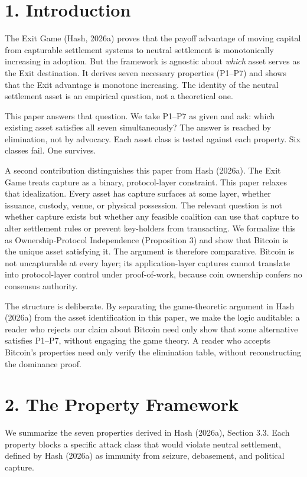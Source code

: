 \documentclass[12pt]{article}
\theoremstyle{definition}
\theoremstyle{remark}
\begin{document}
\newpage

\section{1. Introduction}

The Exit Game (Hash, 2026a) proves that the payoff advantage of moving
capital from capturable settlement systems to neutral settlement is
monotonically increasing in adoption. But the framework is agnostic
about \emph{which} asset serves as the Exit destination. It derives
seven necessary properties (P1--P7) and shows that the Exit advantage is
monotone increasing. The identity of the neutral settlement asset is an
empirical question, not a theoretical one.

This paper answers that question. We take P1--P7 as given and ask: which
existing asset satisfies all seven simultaneously? The answer is reached
by elimination, not by advocacy. Each asset class is tested against each
property. Six classes fail. One survives.

A second contribution distinguishes this paper from Hash (2026a). The
Exit Game treats capture as a binary, protocol-layer constraint. This
paper relaxes that idealization. Every asset has capture surfaces at
some layer, whether issuance, custody, venue, or physical possession.
The relevant question is not whether capture exists but whether any
feasible coalition can use that capture to alter settlement rules or
prevent key-holders from transacting. We formalize this as
Ownership-Protocol Independence (Proposition 3) and show that Bitcoin
is the unique asset satisfying it. The argument is therefore
comparative. Bitcoin is not uncapturable at every layer; its
application-layer captures cannot translate into protocol-layer control
under proof-of-work, because coin ownership confers no consensus
authority.

The structure is deliberate. By separating the game-theoretic argument
in Hash (2026a) from the asset identification in this paper, we make the
logic auditable: a reader who rejects our claim about Bitcoin need only
show that some alternative satisfies P1--P7, without engaging the game
theory. A reader who accepts Bitcoin's properties need only verify the
elimination table, without reconstructing the dominance proof.
\section{2. The Property Framework}

We summarize the seven properties derived in Hash (2026a), Section 3.3.
Each property blocks a specific attack class that would violate neutral
settlement, defined by Hash (2026a) as immunity from seizure,
debasement, and political capture.
\end{document}
